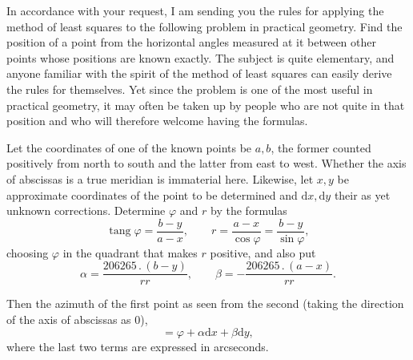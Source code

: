 In accordance with your request, I am sending you the rules for applying the method of least squares to the following problem in practical geometry. Find the position of a point from the horizontal angles measured at it between other points whose positions are known exactly. The subject is quite elementary, and anyone familiar with the spirit of the method of least squares can easily derive the rules for themselves. Yet since the problem is one of the most useful in practical geometry, it may often be taken up by people who are not quite in that position and who will therefore welcome having the formulas.

Let the coordinates of one of the known points be \(a,b\), the former counted positively from north to south and the latter from east to west. Whether the axis of abscissas is a true meridian is immaterial here. Likewise, let \(x,y\) be approximate coordinates of the point to be determined and \(\mathrm{d}x,\mathrm{d}y\) their as yet unknown corrections. Determine \(\varphi\) and \(r\) by the formulas
\[
 \operatorname{tang}\varphi=\frac{b-y}{a-x},\qquad
 r=\frac{a-x}{\cos\varphi}=\frac{b-y}{\sin\varphi},
\]
\noindent choosing \(\varphi\) in the quadrant that makes \(r\) positive, and also put
\[
 \alpha=\frac{206265\,.\,(b-y)}{rr},\qquad
 \beta=-\frac{206265\,.\,(a-x)}{rr}.
\]

Then the azimuth of the first point as seen from the second (taking the direction of the axis of abscissas as \(0\)),
\[
 =\varphi+\alpha\mathrm{d}x+\beta\mathrm{d}y,
\]
\noindent where the last two terms are expressed in arcseconds.
